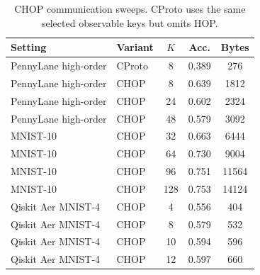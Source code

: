 \begin{table}[t]
\centering
\caption{CHOP communication sweeps. CProto uses the same selected observable keys but omits HOP.}
\label{tab:chop-sweep}
\begin{tabular}{llccc}
\toprule
Setting & Variant & \(K\) & Acc. & Bytes \\
\midrule
PennyLane high-order & CProto & 8 & 0.389 & 276 \\
PennyLane high-order & CHOP & 8 & 0.639 & 1812 \\
PennyLane high-order & CHOP & 24 & 0.602 & 2324 \\
PennyLane high-order & CHOP & 48 & 0.579 & 3092 \\
\midrule
MNIST-10 & CHOP & 32 & 0.663 & 6444 \\
MNIST-10 & CHOP & 64 & 0.730 & 9004 \\
MNIST-10 & CHOP & 96 & 0.751 & 11564 \\
MNIST-10 & CHOP & 128 & 0.753 & 14124 \\
\midrule
Qiskit Aer MNIST-4 & CHOP & 4 & 0.556 & 404 \\
Qiskit Aer MNIST-4 & CHOP & 8 & 0.579 & 532 \\
Qiskit Aer MNIST-4 & CHOP & 10 & 0.594 & 596 \\
Qiskit Aer MNIST-4 & CHOP & 12 & 0.597 & 660 \\
\bottomrule
\end{tabular}
\end{table}
